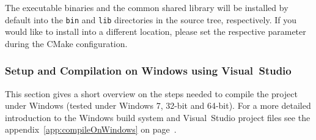 The executable binaries and the common shared library will be installed by default into the
\texttt{bin} and \texttt{lib} directories in the source tree,
respectively. If you would like to install into a different location,
please set the respective parameter during the CMake configuration.

\subsubsection{Setup and Compilation on Windows using Visual~Studio}

This section gives a short overview on the steps needed to compile the
project under Windows (tested under Windows 7, 32-bit and 64-bit). For a more
detailed introduction to the Windows build system and Visual~Studio
project files see the appendix~\ref{app:compileOnWindows} on
page~\pageref{app:compileOnWindows}.

